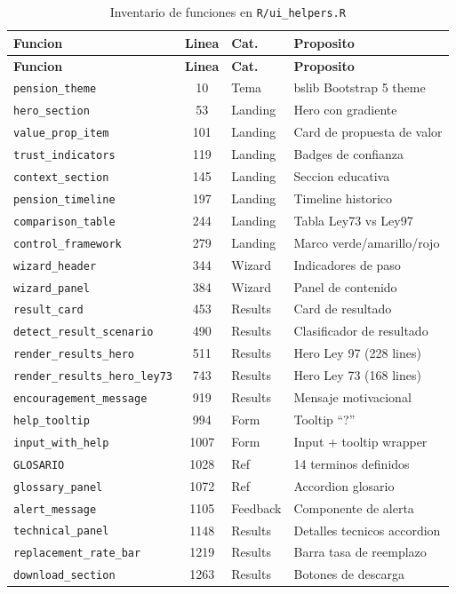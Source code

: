 \documentclass[11pt, letterpaper, twoside]{report}
\begin{document}
\begin{longtable}{lclp{5.5cm}}
\caption{Inventario de funciones en \texttt{R/ui\_helpers.R}} \label{tab:ui_functions} \\
\toprule
\textbf{Funcion} & \textbf{Linea} & \textbf{Cat.} & \textbf{Proposito} \\
\midrule
\endfirsthead
\toprule
\textbf{Funcion} & \textbf{Linea} & \textbf{Cat.} & \textbf{Proposito} \\
\midrule
\endhead
\texttt{pension\_theme} & 10 & Tema & bslib Bootstrap 5 theme \\
\texttt{hero\_section} & 53 & Landing & Hero con gradiente \\
\texttt{value\_prop\_item} & 101 & Landing & Card de propuesta de valor \\
\texttt{trust\_indicators} & 119 & Landing & Badges de confianza \\
\texttt{context\_section} & 145 & Landing & Seccion educativa \\
\texttt{pension\_timeline} & 197 & Landing & Timeline historico \\
\texttt{comparison\_table} & 244 & Landing & Tabla Ley73 vs Ley97 \\
\texttt{control\_framework} & 279 & Landing & Marco verde/amarillo/rojo \\
\texttt{wizard\_header} & 344 & Wizard & Indicadores de paso \\
\texttt{wizard\_panel} & 384 & Wizard & Panel de contenido \\
\texttt{result\_card} & 453 & Results & Card de resultado \\
\texttt{detect\_result\_scenario} & 490 & Results & Clasificador de resultado \\
\texttt{render\_results\_hero} & 511 & Results & Hero Ley 97 (228 lines) \\
\texttt{render\_results\_hero\_ley73} & 743 & Results & Hero Ley 73 (168 lines) \\
\texttt{encouragement\_message} & 919 & Results & Mensaje motivacional \\
\texttt{help\_tooltip} & 994 & Form & Tooltip ``?'' \\
\texttt{input\_with\_help} & 1007 & Form & Input + tooltip wrapper \\
\texttt{GLOSARIO} & 1028 & Ref & 14 terminos definidos \\
\texttt{glossary\_panel} & 1072 & Ref & Accordion glosario \\
\texttt{alert\_message} & 1105 & Feedback & Componente de alerta \\
\texttt{technical\_panel} & 1148 & Results & Detalles tecnicos accordion \\
\texttt{replacement\_rate\_bar} & 1219 & Results & Barra tasa de reemplazo \\
\texttt{download\_section} & 1263 & Results & Botones de descarga \\
\bottomrule
\end{longtable}
\end{document}
